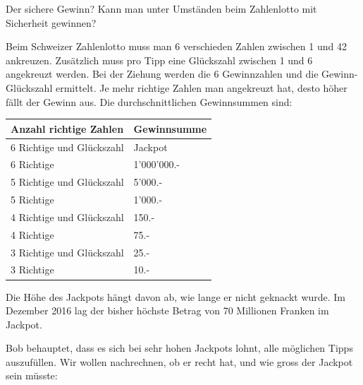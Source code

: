 \clearpage



\begin{ueb}
    {Der sichere Gewinn?}{}
    Kann man unter Umständen beim Zahlenlotto mit Sicherheit gewinnen?

    Beim Schweizer Zahlenlotto muss man 6 verschieden Zahlen zwischen 1 und 42 ankreuzen. Zusätzlich muss pro Tipp eine Glückszahl zwischen 1 und 6 angekreuzt werden. Bei der Ziehung werden die 6 Gewinnzahlen und die Gewinn-Glückszahl ermittelt. Je mehr richtige Zahlen man angekreuzt hat, desto höher fällt der Gewinn aus. Die durchschnittlichen Gewinnsummen sind:

    \begin{center}


        \begin{tabular}{@{}ll@{}}
            \toprule
            \textbf{Anzahl richtige Zahlen} & \textbf{Gewinnsumme} \\ \midrule
            6 Richtige und Glückszahl       & Jackpot              \\
            6 Richtige                      & 1'000'000.-          \\
            5 Richtige und Glückszahl       & 5'000.-              \\
            5 Richtige                      & 1'000.-              \\
            4 Richtige und Glückszahl       & 150.-                \\
            4 Richtige                      & 75.-                 \\
            3 Richtige und Glückszahl       & 25.-                 \\
            3 Richtige                      & 10.-                 \\ \bottomrule
        \end{tabular}

    \end{center}
    Die Höhe des Jackpots hängt davon ab, wie lange er nicht geknackt wurde. Im Dezember 2016 lag der bisher höchste Betrag von 70 Millionen Franken im Jackpot.

    Bob behauptet, dass es sich bei sehr hohen Jackpots lohnt, alle möglichen Tipps auszufüllen. Wir wollen nachrechnen, ob er recht hat, und wie gross der Jackpot sein müsste:


\end{ueb}
